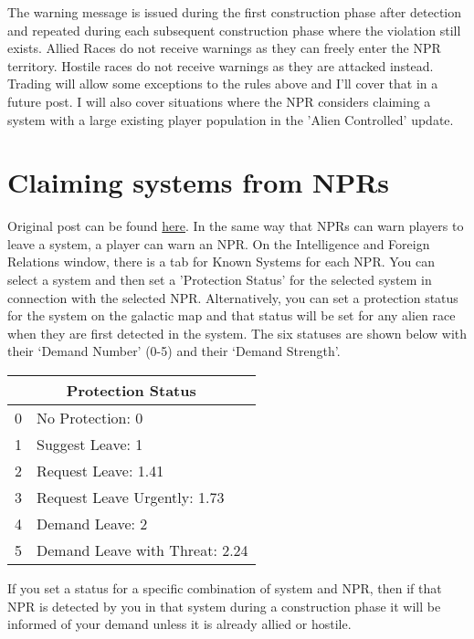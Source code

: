 \documentclass[10pt,a4paper,oneside]{article}
\begin{document}
The warning message is issued during the first construction phase after detection and repeated during each subsequent construction phase where the violation still exists. Allied Races do not receive warnings as they can freely enter the NPR territory. Hostile races do not receive warnings as they are attacked instead. Trading will allow some exceptions to the rules above and I'll cover that in a future post. I will also cover situations where the NPR considers claiming a system with a large existing player population in the 'Alien Controlled' update.

\section{Claiming systems from NPRs}\label{3_claiming_npr_systems}
Original post can be found
\href{http://aurora2.pentarch.org/index.php?topic=8495.msg118362#msg118362}{here}.
\newline\newline
In the same way that NPRs can warn players to leave a system, a player can warn an NPR. On the Intelligence and Foreign Relations window, there is a tab for Known Systems for each NPR. You can select a system and then set a 'Protection Status' for the selected system in connection with the selected NPR. Alternatively, you can set a protection status for the system on the galactic map and that status will be set for any alien race when they are first detected in the system. The six statuses are shown below with their ‘Demand Number’ (0-5) and their ‘Demand Strength’.

\begin{center}
	\begin{tabular}{|l|l|}
		\hline
		\multicolumn{2}{|c|}{\textbf{Protection Status}} \\
		\hline
		0 & No Protection: 0 \\
		\hline
		1 & Suggest Leave: 1 \\
		\hline
		2 & Request Leave: 1.41 \\
		\hline
		3 & Request Leave Urgently: 1.73 \\
		\hline
		4 & Demand Leave: 2 \\
		\hline
		5 & Demand Leave with Threat: 2.24 \\
		\hline
\end{tabular}
\end{center}


If you set a status for a specific combination of system and NPR, then if that NPR is detected by you in that system during a construction phase it will be informed of your demand unless it is already allied or hostile.
\end{document}
